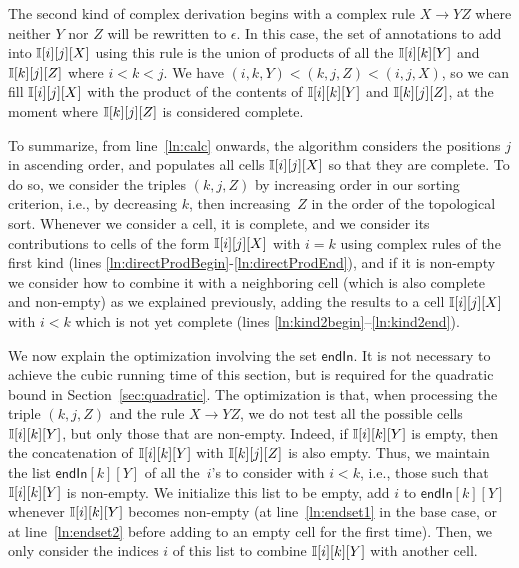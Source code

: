 The second kind of complex derivation begins with a complex rule $X
\rightarrow YZ$ where neither $Y$ nor $Z$ will be rewritten to $\epsilon$. In this case, the set of
annotations to add into $\mathbb{I}[i][j][X]$ using this rule is the union of
products of all the $\mathbb{I}[i][k][Y]$ and $\mathbb{I}[k][j][Z]$ where $i < k <
j$. We have $(i,k,Y)<(k,j,Z)<(i,j,X)$, so we can fill $\mathbb{I}[i][j][X]$ with the product of the contents of $\mathbb{I}[i][k][Y]$ and $\mathbb{I}[k][j][Z]$,
at the moment where $\mathbb{I}[k][j][Z]$ is considered complete.
%
%
%
%

To summarize, from line~\ref{ln:calc} onwards, the algorithm
considers the positions $j$ in ascending order, and 
populates all cells $\mathbb{I}[i][j][X]$ so that they are complete. To do
so, we consider the triples $(k,j,Z)$ by increasing order in our
sorting criterion, i.e., by decreasing $k$, then increasing~$Z$ in the
order of the topological sort. Whenever we consider a cell, it is
complete, and we consider its contributions to cells of the form
$\mathbb{I}[i][j][X]$ with $i=k$ using complex rules of the first kind 
(lines \ref{ln:directProdBegin}-\ref{ln:directProdEnd}), and if it is non-empty
we consider how to combine it with
a neighboring cell (which is also complete and non-empty) as we explained previously,
adding the results to a cell $\mathbb{I}[i][j][X]$ with $i < k$ which is not yet complete (lines
\ref{ln:kind2begin}--\ref{ln:kind2end}).

We now explain the optimization involving the set $\mathsf{endIn}$. It
is not necessary to achieve the cubic running time of
this section, but is required for the quadratic bound in
Section~\ref{sec:quadratic}.  The optimization is that, when processing the
triple $(k,j,Z)$ and the rule $X\rightarrow YZ$, we do not test all the
possible cells $\mathbb{I}[i][k][Y]$, but only those that are
non-empty. Indeed, if $\mathbb{I}[i][k][Y]$ is empty, then the concatenation of
$\mathbb{I}[i][k][Y]$ with $\mathbb{I}[k][j][Z]$ is also empty. Thus, we maintain
the list $\mathsf{endIn}[k][Y]$ of all the~$i$'s to consider
with $i<k$, i.e., those such that $\mathbb{I}[i][k][Y]$ is non-empty. We
initialize this list to be empty, add $i$ to $\mathsf{endIn}[k][Y]$ whenever
$\mathbb{I}[i][k][Y]$ becomes non-empty (at line~\ref{ln:endset1} in the base
case, or at line~\ref{ln:endset2} before adding to an empty cell for
the first time). Then, we only consider the indices
$i$ of this list to combine $\mathbb{I}[i][k][Y]$ with another cell.

